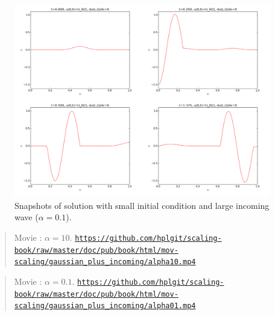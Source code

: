 \documentclass[graybox,envcountchap,sectrefs,final]{svmonodo}
\newenvironment{doconce:movie}{}{}
\newcounter{doconce:movie:counter}
\begin{document}
\begin{figure}[!ht]  %
  \centerline{\includegraphics[width=1.0\linewidth]{fig-scaling/gaussian_plus_incoming_alpha01.pdf}}
  \caption{
  Snapshots of solution with small initial condition and large incoming wave ($\alpha=0.1$). \label{scale:wave:pde2:fig:alpha01}
  }
\end{figure}



\begin{doconce:movie}
\begin{quote}
Movie : $\alpha=10$. \href{https://github.com/hplgit/scaling-book/raw/master/doc/pub/book/html/mov-scaling/gaussian_plus_incoming/alpha10.mp4}{\nolinkurl{https://github.com/hplgit/scaling-book/raw/master/doc/pub/book/html/mov-scaling/gaussian_plus_incoming/alpha10.mp4}}
\end{quote}
\end{doconce:movie}



\begin{doconce:movie}
\begin{quote}
Movie : $\alpha=0.1$. \href{https://github.com/hplgit/scaling-book/raw/master/doc/pub/book/html/mov-scaling/gaussian_plus_incoming/alpha01.mp4}{\nolinkurl{https://github.com/hplgit/scaling-book/raw/master/doc/pub/book/html/mov-scaling/gaussian_plus_incoming/alpha01.mp4}}
\end{quote}
\end{doconce:movie}
\end{document}
